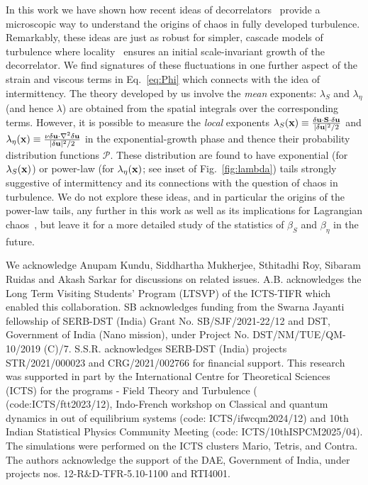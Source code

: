 \documentclass[amsmath,amssymb,amsbsy,pre,twocolumn,tightenlines,superscriptaddress,floatfix]{revtex4-2}
\begin{document}
In this work we have shown how recent ideas of decorrelators~\cite{Subhro_PRL, Subhro_PRB,Lightcone,Shenker2014, GTEuler}
provide a microscopic way to understand the origins of chaos in fully developed turbulence.
Remarkably, these ideas are just as robust for simpler, cascade models of turbulence where
locality~\cite{Luca_shell} ensures an
initial scale-invariant growth of the decorrelator.
We find signatures of these fluctuations in one further aspect of the strain
and viscous terms in Eq.~\eqref{eq:Phi} which connects with the idea of
intermittency. The theory developed by us involve the
\textit{mean} exponents: $\lambda_S$ and $\lambda_\eta$ (and hence $\lambda$)
are obtained from the spatial integrals over the corresponding terms.
However, it is possible to measure the \textit{local} exponents
$\lambda_S ({\bf x}) \equiv  \frac{\delta {\bf u}\cdot \mathbf{S} \cdot \delta {\bf
u}}{|\delta {\bf u}|^2/2}$ and $\lambda_\eta ({\bf x}) \equiv \frac{\nu \delta {\bf u}
\cdot \nabla^2 \delta {\bf u}}{|\delta {\bf u}|^2/2}$ in the exponential-growth
phase
and thence their probability distribution functions $\mathcal{P}$.  These
distribution are found to have
exponential (for $\lambda_S ({\bf x})$) or power-law (for $\lambda_\eta ({\bf x})$; see inset of
Fig.~\ref{fig:lambda}) tails strongly suggestive of intermittency and its connections with the question of
chaos in turbulence.
We do not explore these ideas, and in particular
the origins of the power-law tails, any further in this work as well as its implications for Lagrangian chaos~\cite{Jeremie_Boffetta_Lagrangian_tracers,Ray2018}, but leave it for a more detailed
study of the statistics of $\beta_S$ and $\beta_\eta$ in the future.

\begin{acknowledgements}
        We acknowledge Anupam Kundu, Siddhartha Mukherjee, Sthitadhi Roy, Sibaram Ruidas and Akash Sarkar for discussions on related issues.
	A.B. acknowledges the Long Term Visiting Students' Program (LTSVP) of the
	ICTS-TIFR which enabled this collaboration.
	SB acknowledges funding from the Swarna Jayanti fellowship of SERB-DST (India) Grant
	No. SB/SJF/2021-22/12 and DST, Government of India (Nano mission),
	under Project No. DST/NM/TUE/QM-10/2019 (C)/7.
	S.S.R. acknowledges SERB-DST (India) projects
	STR/2021/000023 and CRG/2021/002766 for financial support.
	This research was supported in part by the International Centre for Theoretical Sciences (ICTS) for the programs -
	Field Theory and Turbulence ( (code:ICTS/ftt2023/12),
	Indo-French workshop on Classical and quantum dynamics in out of equilibrium systems  (code: ICTS/ifwcqm2024/12) and
        10th Indian Statistical Physics Community Meeting (code: ICTS/10thISPCM2025/04).
	The simulations were performed on the ICTS clusters Mario, Tetris, and Contra.
	The authors
	acknowledge the support of the DAE, Government of India,
	under projects nos. 12-R\&D-TFR-5.10-1100 and RTI4001.
\end{acknowledgements}
\end{document}
